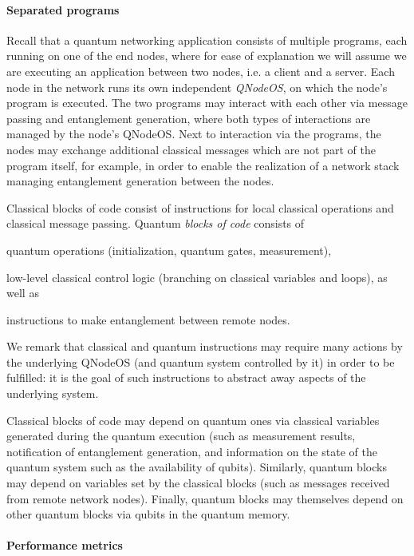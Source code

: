 \paragraph{Separated programs}

Recall that a quantum networking application consists of multiple programs, each running on one of the end nodes, where for ease of explanation we will assume we are executing an application between two nodes, i.e. a client and a server. Each node in the network runs its own independent \emph{\ac{QNodeOS}}, on which the node's program is executed. The two programs may interact with each other via message passing and entanglement generation, where both types of interactions are managed by the node's \ac{QNodeOS}. Next to interaction via the programs, the nodes may exchange additional classical messages which are not part of the program itself, for example, in order to enable the realization of a network stack~\cite{dahlberg_2019_egp} managing entanglement generation between the nodes.

Classical blocks of code consist of instructions for local classical operations and classical message passing. Quantum \emph{blocks of code} consists of
%
\begin{inlinelist}
\item quantum operations (initialization, quantum gates, measurement), 
\item low-level classical control logic (branching on classical variables and loops), as well as 
\item instructions to make entanglement between remote nodes. 
\end{inlinelist}
%
We remark that classical and quantum instructions may require many actions by the underlying \ac{QNodeOS} (and quantum system controlled by it) in order to be fulfilled: it is the goal of such instructions to abstract away aspects of the underlying system.

Classical blocks of code may depend on quantum ones via classical variables generated during the quantum execution (such as measurement results, notification of entanglement generation, and information on the state of the quantum system such as the availability of qubits). Similarly, quantum blocks may depend on variables set by the classical blocks (such as messages received from remote network nodes). Finally, quantum blocks may themselves depend on other quantum blocks via qubits in the quantum memory. 

\paragraph{Performance metrics}

